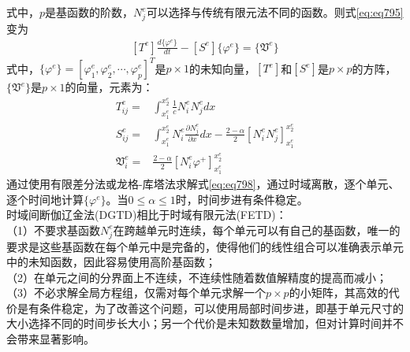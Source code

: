 \documentclass{article}
\numberwithin{equation}{section}
\begin{document}
式中，$p$是基函数的阶数，$N_j^e$可以选择与传统有限元法不同的函数。则式\ref{eq:eq795}变为
\begin{align}
    \label{eq:eq798}
    [T^e]\frac{d\{\varphi^e\}}{dt}-[S^e]\{\varphi^e\}=\{\mathfrak{V}^e\}
\end{align}
式中，$\{\varphi^e\}=\left[\varphi^e_1,\varphi^e_2,\cdots,\varphi^e_p\right]^T$是$p\times 1$的未知向量，$[T^e]$和$[S^e]$是$p\times p$的方阵，$\{\mathfrak{V}^e\}$是$p\times 1$的向量，元素为：
\begin{align}
    \label{eq:eq799}
    T^e_{ij}=&\int_{x_1^e}^{x_2^e}\frac{1}{c}N_i^eN_j^edx \\
    \label{eq:eq800}
    S^e_{ij}=&\int_{x_1^e}^{x_2^e}N_i^e\frac{\partial N_j^e}{\partial x}dx-\frac{2-\alpha}{2}\left[N_i^eN_j^e\right]_{x_1^e}^{x_2^e} \\
    \label{eq:eq801}
    \mathfrak{V}^e_i=&\frac{2-\alpha}{2}\left[N_i^e\varphi^+\right]_{x_1^e}^{x_2^e}
\end{align}
通过使用有限差分法或龙格-库塔法求解式\ref{eq:eq798}，通过时域离散，逐个单元、逐个时间地计算$\{\varphi^e\}$。当$0\leq \alpha \leq 1$时，时间步进有条件稳定。\\
时域间断伽辽金法(DGTD)相比于时域有限元法(FETD)：\\
（1）不要求基函数$N_j^e$在跨越单元时连续，每个单元可以有自己的基函数，唯一的要求是这些基函数在每个单元中是完备的，使得他们的线性组合可以准确表示单元中的未知函数，因此容易使用高阶基函数；\\
（2）在单元之间的分界面上不连续，不连续性随着数值解精度的提高而减小；\\
（3）不必求解全局方程组，仅需对每个单元求解一个$p\times p$的小矩阵，其高效的代价是有条件稳定，为了改善这个问题，可以使用局部时间步进，即基于单元尺寸的大小选择不同的时间步长大小；另一个代价是未知数数量增加，但对计算时间并不会带来显著影响。
\end{document}
